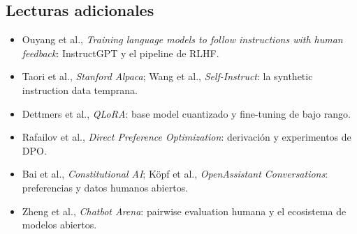 \subsection{Lecturas adicionales}

\begin{itemize}
  \item Ouyang et al., \emph{Training language models to follow instructions with human feedback}: InstructGPT y el pipeline de RLHF.
  \item Taori et al., \emph{Stanford Alpaca}; Wang et al., \emph{Self-Instruct}: la synthetic instruction data temprana.
  \item Dettmers et al., \emph{QLoRA}: base model cuantizado y fine-tuning de bajo rango.
  \item Rafailov et al., \emph{Direct Preference Optimization}: derivación y experimentos de DPO.
  \item Bai et al., \emph{Constitutional AI}; Köpf et al., \emph{OpenAssistant Conversations}: preferencias y datos humanos abiertos.
  \item Zheng et al., \emph{Chatbot Arena}: pairwise evaluation humana y el ecosistema de modelos abiertos.
\end{itemize}


